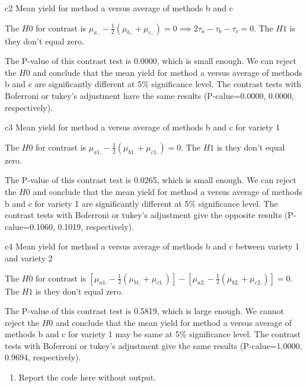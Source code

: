 \documentclass[]{article}
\providecommand{\tightlist}{%
  \setlength{\itemsep}{0pt}\setlength{\parskip}{0pt}}
\begin{document}
c2
\textcolor[rgb]{0.5,0.5,0.5}{Mean yield for method a versus average of methods b and c}

The \(H0\) for contrast is
\(\mu_{a..}-\frac12(\mu_{b..}+\mu_{c..})=0\implies2\tau_a-\tau_b-\tau_c=0\).
The \(H1\) is they don't equal zero.

The P-value of this contrast test is 0.0000, which is small enough. We
can reject the \(H0\) and conclude that the mean yield for method a
versus average of methods b and c are significantly different at 5\%
significance level. The contrast tests with Boferroni or tukey's
adjustment have the same results (P-calue=0.0000, 0.0000, respectively).

c3
\textcolor[rgb]{0.5,0.5,0.5}{ Mean yield for method a versus average of methods b and c for variety 1}

The \(H0\) for contrast is \(\mu_{a1.}-\frac12(\mu_{b1.}+\mu_{c1.})=0\).
The \(H1\) is they don't equal zero.

The P-value of this contrast test is 0.0265, which is small enough. We
can reject the \(H0\) and conclude that the mean yield for method a
versus average of methods b and c for variety 1 are significantly
different at 5\% significance level. The contrast tests with Boferroni
or tukey's adjustment give the opposite results (P-calue=0.1060, 0.1019,
respectively).

c4
\textcolor[rgb]{0.5,0.5,0.5}{Mean yield for method a versus average of methods b and c between variety 1 and variety 2}

The \(H0\) for contrast is
\([\mu_{a1.}-\frac12(\mu_{b1.}+\mu_{c1.})]-[\mu_{a2.}-\frac12(\mu_{b2.}+\mu_{c2.})]=0\).
The \(H1\) is they don't equal zero.

The P-value of this contrast test is 0.5819, which is large enough. We
cannot reject the \(H0\) and conclude that the mean yield for method a
versus average of methods b and c for variety 1 may be same at 5\%
significance level. The contrast tests with Boferroni or tukey's
adjustment give the same results (P-calue=1.0000, 0.9694, respectively).

\begin{enumerate}
\def\labelenumi{(\alph{enumi})}
\setcounter{enumi}{7}
\tightlist
\item
  \textcolor[rgb]{0.5,0.5,0.5}{Report the code here without output.}
\end{enumerate}
\end{document}
